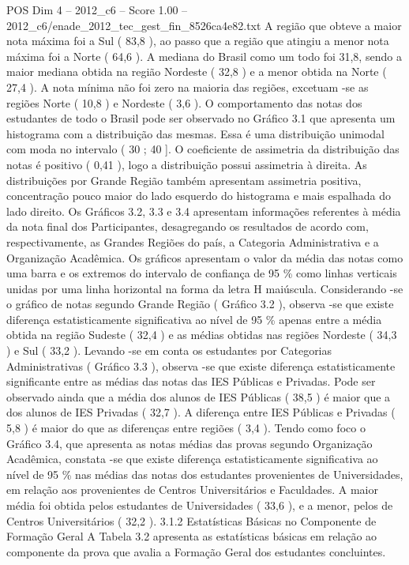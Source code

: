 \begin{textsample}{POS Dim 4 – 2012\_c6 – Score 1.00 – 2012\_c6/enade\_2012\_tec\_gest\_fin\_8526ca4e82.txt}
A região que obteve a maior nota máxima foi a Sul ( 83,8 ), ao passo que a região que atingiu a menor nota máxima foi a Norte ( 64,6 ).
A mediana do Brasil como um todo foi 31,8, sendo a maior mediana obtida na região Nordeste ( 32,8 ) e a menor obtida na Norte ( 27,4 ).
A nota mínima não foi zero na maioria das regiões, excetuam -se as regiões Norte ( 10,8 ) e Nordeste ( 3,6 ).
O comportamento das notas dos estudantes de todo o Brasil pode ser observado no Gráfico 3.1 que apresenta um histograma com a distribuição das mesmas.
Essa é uma distribuição unimodal com moda no intervalo ( 30 ; 40 ].
O coeficiente de assimetria da distribuição das notas é positivo ( 0,41 ), logo a distribuição possui assimetria à direita.
As distribuições por Grande Região também apresentam assimetria positiva, concentração pouco maior do lado esquerdo do histograma e mais espalhada do lado direito.
Os Gráficos 3.2, 3.3 e 3.4 apresentam informações referentes à média da nota final dos Participantes, desagregando os resultados de acordo com, respectivamente, as Grandes Regiões do país, a Categoria Administrativa e a Organização Acadêmica.
Os gráficos apresentam o valor da média das notas como uma barra e os extremos do intervalo de confiança de 95 \% como linhas verticais unidas por uma linha horizontal na forma da letra H maiúscula.
Considerando -se o gráfico de notas segundo Grande Região ( Gráfico 3.2 ), observa -se que existe diferença estatisticamente significativa ao nível de 95 \% apenas entre a média obtida na região Sudeste ( 32,4 ) e as médias obtidas nas regiões Nordeste ( 34,3 ) e Sul ( 33,2 ).
Levando -se em conta os estudantes por Categorias Administrativas ( Gráfico 3.3 ), observa -se que existe diferença estatisticamente significante entre as médias das notas das IES Públicas e Privadas.
Pode ser observado ainda que a média dos alunos de IES Públicas ( 38,5 ) é maior que a dos alunos de IES Privadas ( 32,7 ).
A diferença entre IES Públicas e Privadas ( 5,8 ) é maior do que as diferenças entre regiões ( 3,4 ).
Tendo como foco o Gráfico 3.4, que apresenta as notas médias das provas segundo Organização Acadêmica, constata -se que existe diferença estatisticamente significativa ao nível de 95 \% nas médias das notas dos estudantes provenientes de Universidades, em relação aos provenientes de Centros Universitários e Faculdades.
A maior média foi obtida pelos estudantes de Universidades ( 33,6 ), e a menor, pelos de Centros Universitários ( 32,2 ). 3.1.2 Estatísticas Básicas no Componente de Formação Geral A Tabela 3.2 apresenta as estatísticas básicas em relação ao componente da prova que avalia a Formação Geral dos estudantes concluintes.

\end{textsample}
